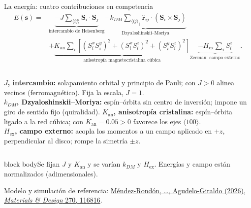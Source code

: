 \documentclass[aspectratio=169,10pt]{beamer}
\newcommand{\D}{k_{DM}}
\newcommand{\Hex}{H_{\mathrm{ex}}}
\newcommand{\Kan}{K_{\mathrm{an}}}
\newcommand{\idea}[1]{\vspace{2pt}\begin{beamercolorbox}[rounded=true,sep=5pt,wd=\linewidth]{block body}\small #1\end{beamercolorbox}}
\newcommand{\fuente}[1]{{\fontsize{6.5}{8}\selectfont\color{black!60}#1\par}}
\begin{document}
\begin{frame}{La energía: cuatro contribuciones en competencia}
\small
\begin{align*}
E(\mathbf s)={}&\underbrace{-J\sum_{\langle ij\rangle}\mathbf S_i\cdot\mathbf S_j}_{\text{intercambio de Heisenberg}}
\underbrace{-\D\sum_{\langle ij\rangle_\parallel}\widehat{\mathbf r}_{ij}\cdot(\mathbf S_i\times\mathbf S_j)}_{\text{Dzyaloshinskii--Moriya}}\\[-5pt]
&+\underbrace{\Kan\sum_i[(S_i^xS_i^y)^2+(S_i^xS_i^z)^2+(S_i^yS_i^z)^2]}_{\text{anisotropía magnetocristalina cúbica}}
\underbrace{-\Hex\sum_i S_i^z}_{\text{Zeeman: campo externo}}.
\end{align*}
{\footnotesize
\begin{columns}[T,onlytextwidth]
\textbf{$J$, intercambio:} solapamiento orbital y principio de Pauli; con $J>0$ alinea vecinos (ferromagnético). Fija la escala, $J=1$.\\[2pt]
\textbf{$\D$, Dzyaloshinskii--Moriya:} espín--órbita sin centro de inversión; impone un giro de sentido fijo (quiralidad).
\textbf{$\Kan$, anisotropía cristalina:} espín--órbita ligado a la red cúbica; con $\Kan=0.05>0$ favorece los ejes $\langle100\rangle$.\\[2pt]
\textbf{$\Hex$, campo externo:} acopla los momentos a un campo aplicado en $+z$, perpendicular al disco; rompe la simetría $\pm z$.
\end{columns}}
\idea{Se fijan $J$ y $\Kan$ y se varían $\D$ y $\Hex$. Energías y campo están normalizados (adimensionales).}
\fuente{Modelo y simulación de referencia: \href{https://doi.org/10.1016/j.matdes.2026.116816}{Méndez-Rondón, \dots, Agudelo-Giraldo (2026), \emph{Materials \& Design} 270, 116816}.}
\end{frame}
\end{document}
